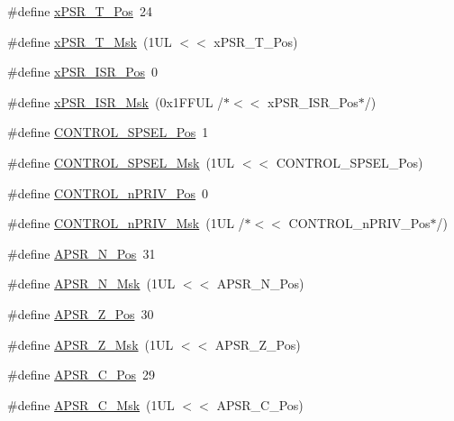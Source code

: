 \begin{DoxyCompactItemize}
\item 
\#define \hyperlink{group__CMSIS__CORE_ga98d801da9a49cda944f52aeae104dd38}{x\+P\+S\+R\+\_\+\+T\+\_\+\+Pos}~24
\item 
\#define \hyperlink{group__CMSIS__CORE_ga30ae2111816e82d47636a8d4577eb6ee}{x\+P\+S\+R\+\_\+\+T\+\_\+\+Msk}~(1\+U\+L $<$$<$ x\+P\+S\+R\+\_\+\+T\+\_\+\+Pos)
\item 
\#define \hyperlink{group__CMSIS__CORE_ga21bff245fb1aef9683f693d9d7bb2233}{x\+P\+S\+R\+\_\+\+I\+S\+R\+\_\+\+Pos}~0
\item 
\#define \hyperlink{group__CMSIS__CORE_gadf8eed87e0081dfe1ef1c78a0ea91afd}{x\+P\+S\+R\+\_\+\+I\+S\+R\+\_\+\+Msk}~(0x1\+F\+F\+U\+L /$\ast$$<$$<$ x\+P\+S\+R\+\_\+\+I\+S\+R\+\_\+\+Pos$\ast$/)
\item 
\#define \hyperlink{group__CMSIS__CORE_ga07eafc53e609895342c6a530e9d01310}{C\+O\+N\+T\+R\+O\+L\+\_\+\+S\+P\+S\+E\+L\+\_\+\+Pos}~1
\item 
\#define \hyperlink{group__CMSIS__CORE_ga70b29840969b06909da21369b0b05b53}{C\+O\+N\+T\+R\+O\+L\+\_\+\+S\+P\+S\+E\+L\+\_\+\+Msk}~(1\+U\+L $<$$<$ C\+O\+N\+T\+R\+O\+L\+\_\+\+S\+P\+S\+E\+L\+\_\+\+Pos)
\item 
\#define \hyperlink{group__CMSIS__CORE_ga51b95bc03ec0d815b459bde0b14a5908}{C\+O\+N\+T\+R\+O\+L\+\_\+n\+P\+R\+I\+V\+\_\+\+Pos}~0
\item 
\#define \hyperlink{group__CMSIS__CORE_gaef3b20d77acb213338f89ce5e7bc36b0}{C\+O\+N\+T\+R\+O\+L\+\_\+n\+P\+R\+I\+V\+\_\+\+Msk}~(1\+U\+L /$\ast$$<$$<$ C\+O\+N\+T\+R\+O\+L\+\_\+n\+P\+R\+I\+V\+\_\+\+Pos$\ast$/)
\item 
\#define \hyperlink{group__CMSIS__CORE_gac469528d210043c7bd3f12f0e6824766}{A\+P\+S\+R\+\_\+\+N\+\_\+\+Pos}~31
\item 
\#define \hyperlink{group__CMSIS__CORE_gadbc2cf55a026f661b53fadfcf822cef1}{A\+P\+S\+R\+\_\+\+N\+\_\+\+Msk}~(1\+U\+L $<$$<$ A\+P\+S\+R\+\_\+\+N\+\_\+\+Pos)
\item 
\#define \hyperlink{group__CMSIS__CORE_ga3661286d108b1aca308d7445685eae3a}{A\+P\+S\+R\+\_\+\+Z\+\_\+\+Pos}~30
\item 
\#define \hyperlink{group__CMSIS__CORE_ga1deb4d1aa72bb83d1f79329406f15711}{A\+P\+S\+R\+\_\+\+Z\+\_\+\+Msk}~(1\+U\+L $<$$<$ A\+P\+S\+R\+\_\+\+Z\+\_\+\+Pos)
\item 
\#define \hyperlink{group__CMSIS__CORE_ga6cf72aa6f09a168f9e5beda1a4a887b9}{A\+P\+S\+R\+\_\+\+C\+\_\+\+Pos}~29
\item 
\#define \hyperlink{group__CMSIS__CORE_ga6d47803fbad455bc10bd1ce59f2f335d}{A\+P\+S\+R\+\_\+\+C\+\_\+\+Msk}~(1\+U\+L $<$$<$ A\+P\+S\+R\+\_\+\+C\+\_\+\+Pos)
$$
\end{DoxyCompactItemize}
